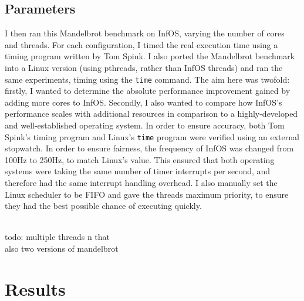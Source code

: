 \documentclass[bsc,frontabs,twoside,singlespacing,parskip,deptreport]{infthesis}     %
\begin{document}
\subsection{Parameters}
I then ran this Mandelbrot benchmark on InfOS, varying the number of cores and threads. For each configuration, I timed the real execution time using a timing program written by Tom Spink. I also ported the Mandelbrot benchmark into a Linux version (using pthreads, rather than InfOS threads) and ran the same experiments, timing using the \verb|time| command. The aim here was twofold: firstly, I wanted to determine the absolute performance improvement gained by adding more cores to InfOS. Secondly, I also wanted to compare how InfOS's performance scales with additional resources in comparison to a highly-developed and well-established operating system. In order to ensure accuracy, both Tom Spink's timing program and Linux's \verb|time| program were verified using an external stopwatch. In order to ensure fairness, the frequency of InfOS was changed from 100Hz to 250Hz, to match Linux's value. This ensured that both operating systems were taking the same number of timer interrupts per second, and therefore had the same interrupt handling overhead. I also manually set the Linux scheduler to be FIFO and gave the threads maximum priority, to ensure they had the best possible chance of executing quickly. 

\\todo: multiple threads n that
\\also two versions of mandelbrot


\section{Results}
\end{document}
